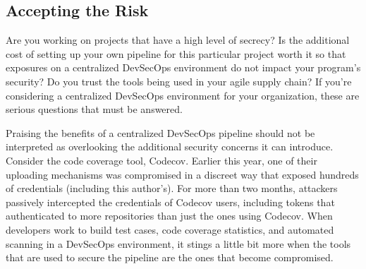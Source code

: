 \subsection{Accepting the Risk}
Are you working on projects that have a high level of secrecy? Is the additional cost of setting up your own pipeline for this particular project worth it so that exposures on a centralized DevSecOps environment do not impact your program's security? Do you trust the tools being used in your agile supply chain? If you're considering a centralized DevSecOps environment for your organization, these are serious questions that must be answered.

Praising the benefits of a centralized DevSecOps pipeline should not be interpreted as overlooking the additional security concerns it can introduce. Consider the code coverage tool, Codecov. Earlier this year, one of their uploading mechanisms was compromised in a discreet way that exposed hundreds of credentials (including this author's).\autocite{20211101:sharma2021} For more than two months, attackers passively intercepted the credentials of Codecov users, including tokens that authenticated to more repositories than just the ones using Codecov. When developers work to build test cases, code coverage statistics, and automated scanning in a DevSecOps environment, it stings a little bit more when the tools that are used to secure the pipeline are the ones that become compromised.

